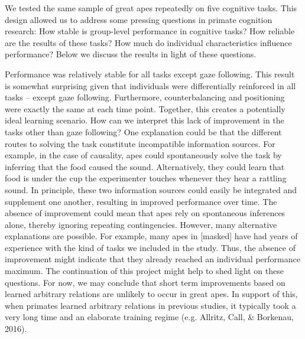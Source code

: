 \documentclass[10pt, letterpaper]{article}
\begin{document}
We tested the same sample of great apes repeatedly on five cognitive
tasks. This design allowed us to address some pressing questions in
primate cognition research: How stable is group-level performance in
cognitive tasks? How reliable are the results of these tasks? How much
do individual characteristics influence performance? Below we discuss
the results in light of these questions.

Performance was relatively stable for all tasks except gaze following.
This result is somewhat surprising given that individuals were
differentially reinforced in all tasks -- except gaze following.
Furthermore, counterbalancing and positioning were exactly the same at
each time point. Together, this creates a potentially ideal learning
scenario. How can we interpret this lack of improvement in the tasks
other than gaze following? One explanation could be that the different
routes to solving the task constitute incompatible information sources.
For example, in the case of causality, apes could spontaneously solve
the task by inferring that the food caused the sound. Alternatively,
they could learn that food is under the cup the experimenter touches
whenever they hear a rattling sound. In principle, these two information
sources could easily be integrated and supplement one another, resulting
in improved performance over time. The absence of improvement could mean
that apes rely on spontaneous inferences alone, thereby ignoring
repeating contingencies. However, many alternative explanations are
possible. For example, many apes in {[}masked{]} have had years of
experience with the kind of tasks we included in the study. Thus, the
absence of improvement might indicate that they already reached an
individual performance maximum. The continuation of this project might
help to shed light on these questions. For now, we may conclude that
short term improvements based on learned arbitrary relations are
unlikely to occur in great apes. In support of this, when primates
learned arbitrary relations in previous studies, it typically took a
very long time and an elaborate training regime (e.g. Allritz, Call, \&
Borkenau, 2016).
\end{document}
